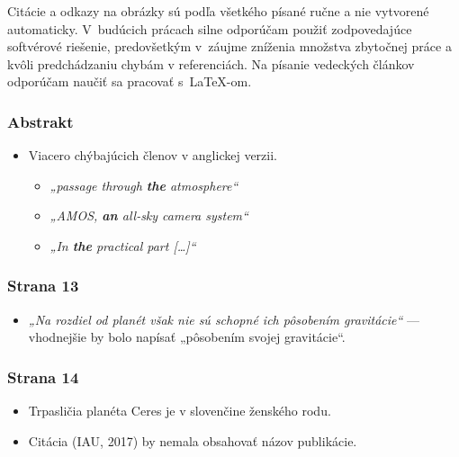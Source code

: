 Citácie a odkazy na obrázky sú podľa všetkého písané ručne a nie
vytvorené automaticky. V~budúcich prácach silne odporúčam použiť
zodpovedajúce softvérové riešenie, predovšetkým v~záujme zníženia
množstva zbytočnej práce a kvôli predchádzaniu chybám v referenciách. Na
písanie vedeckých článkov odporúčam naučiť sa pracovať s~\LaTeX-om.

\hypertarget{abstrakt}{%
\subsubsection{Abstrakt}\label{abstrakt}}

\begin{itemize}
\tightlist
\item
  Viacero chýbajúcich členov v anglickej verzii.

  \begin{itemize}
  \tightlist
  \item
    \emph{„passage through \textbf{the} atmosphere“}
  \item
    \emph{„AMOS, \textbf{an} all-sky camera system“}
  \item
    \emph{„In \textbf{the} practical part {[}\ldots{}{]}“}
  \end{itemize}
\end{itemize}

\hypertarget{strana-13}{%
\subsubsection{Strana 13}\label{strana-13}}

\begin{itemize}
\tightlist
\item
  \emph{„Na rozdiel od planét však nie sú schopné ich pôsobením
  gravitácie“} --- vhodnejšie by bolo napísať „pôsobením svojej
  gravitácie“.
\end{itemize}

\hypertarget{strana-14}{%
\subsubsection{Strana 14}\label{strana-14}}

\begin{itemize}
\tightlist
\item
  Trpasličia planéta Ceres je v slovenčine ženského rodu.
\item
  Citácia (IAU, 2017) by nemala obsahovať názov publikácie.
\end{itemize}

